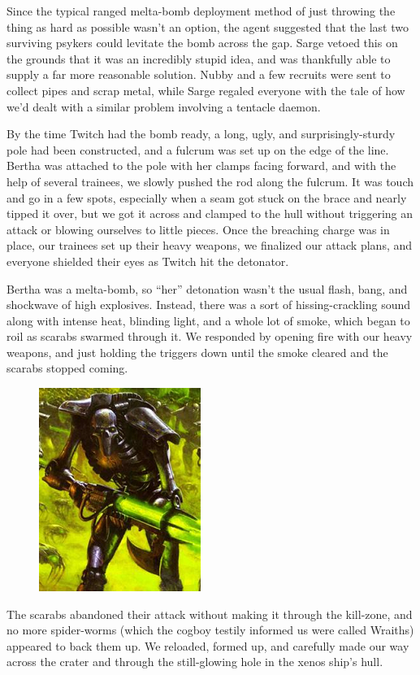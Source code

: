 Since the typical ranged melta-bomb deployment method of just throwing the thing as hard as possible wasn’t an option, the agent suggested that the last two surviving psykers could levitate the bomb across the gap. 
Sarge vetoed this on the grounds that it was an incredibly stupid idea, and was thankfully able to supply a far more reasonable solution. 
Nubby and a few recruits were sent to collect pipes and scrap metal, while Sarge regaled everyone with the tale of how we’d dealt with a similar problem involving a tentacle daemon.

By the time Twitch had the bomb ready, a long, ugly, and surprisingly-sturdy pole had been constructed, and a fulcrum was set up on the edge of the line. 
Bertha was attached to the pole with her clamps facing forward, and with the help of several trainees, we slowly pushed the rod along the fulcrum. 
It was touch and go in a few spots, especially when a seam got stuck on the brace and nearly tipped it over, but we got it across and clamped to the hull without triggering an attack or blowing ourselves to little pieces. 
Once the breaching charge was in place, our trainees set up their heavy weapons, we finalized our attack plans, and everyone shielded their eyes as Twitch hit the detonator.

Bertha was a melta-bomb, so “her” detonation wasn’t the usual flash, bang, and shockwave of high explosives. 
Instead, there was a sort of hissing-crackling sound along with intense heat, blinding light, and a whole lot of smoke, which began to roil as scarabs swarmed through it. 
We responded by opening fire with our heavy weapons, and just holding the triggers down until the smoke cleared and the scarabs stopped coming.

\begin{figure}
	\begin{center}
		\includegraphics[width=\figwidth]{pics/8/46.png}
	\end{center}
\end{figure}
The scarabs abandoned their attack without making it through the kill-zone, and no more spider-worms (which the cogboy testily informed us were called Wraiths) appeared to back them up. 
We reloaded, formed up, and carefully made our way across the crater and through the still-glowing hole in the xenos ship’s hull.

